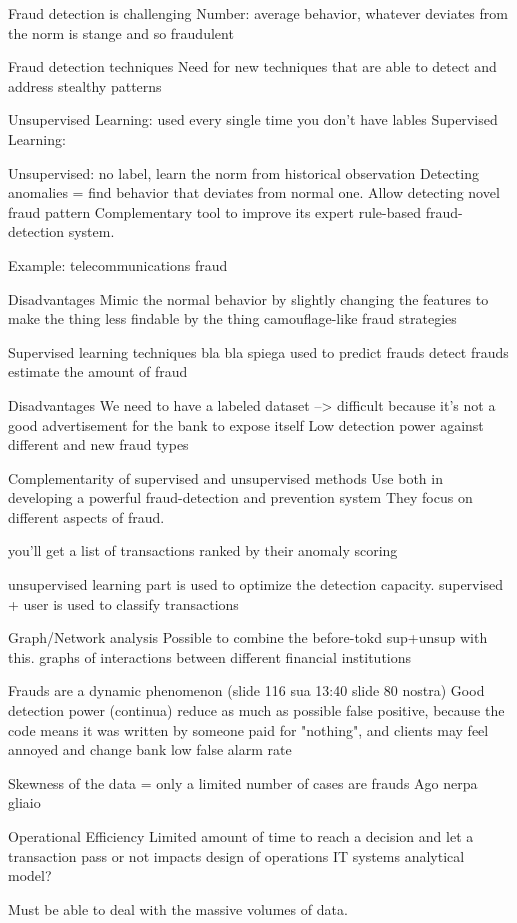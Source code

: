 Fraud detection is challenging
    Number: average behavior, whatever deviates from the norm is stange and so fraudulent 

Fraud detection techniques
    Need for new techniques that are able to detect and
    address stealthy patterns

    Unsupervised Learning: used every single time you don't have lables 
    Supervised Learning: 

Unsupervised:
    no label, learn the norm from historical observation
    Detecting anomalies = find behavior that deviates from normal one.
    Allow detecting novel fraud pattern 
    Complementary tool to improve its expert rule-based fraud-detection system.

    Example: telecommunications fraud 

Disadvantages 
    Mimic the normal behavior by slightly changing the features to make the thing less findable by the thing 
    camouflage-like fraud strategies 

Supervised learning techniques 
    bla bla spiega 
    used to 
    predict frauds
    detect frauds 
    estimate the amount of fraud 

Disadvantages 
    We need to have a labeled dataset --> difficult because it's not a good advertisement for the bank to expose itself 
    Low detection power against different and new fraud types 

Complementarity of supervised and unsupervised methods 
    Use both in developing a powerful fraud-detection and prevention system 
    They focus on different aspects of fraud.

    you'll get a list of transactions ranked by their anomaly scoring 

    unsupervised learning part is used to optimize the detection capacity.
    supervised + user is used to classify transactions 

Graph/Network analysis 
    Possible to combine the before-tokd sup+unsup with this.
    graphs of interactions between different financial institutions 

Frauds are a dynamic phenomenon (slide 116 sua 13:40 slide 80 nostra)
Good detection power (continua)
    reduce as much as possible false positive, because the code means it was written by someone paid for "nothing", and clients may feel annoyed and change bank 
    low false alarm rate

Skewness of the data = only a limited number of cases are frauds 
Ago nerpa gliaio

Operational Efficiency 
    Limited amount of time to reach a decision and let a transaction pass or not 
        impacts design of operations IT systems 
        analytical model?

    Must be able to deal with the massive volumes of data.
\fi